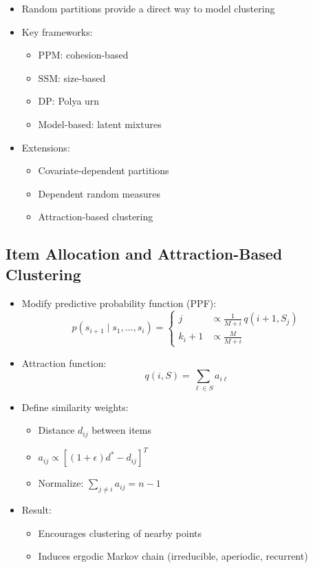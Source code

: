 \documentclass[12pt,oneside]{book}
\numberwithin{equation}{section}
\theoremstyle{definition}
\theoremstyle{plain}
\theoremstyle{remark}
\begin{document}
\begin{itemize}
\item Random partitions provide a direct way to model clustering

\item Key frameworks:
\begin{itemize}
\item PPM: cohesion-based
\item SSM: size-based
\item DP: Polya urn
\item Model-based: latent mixtures
\end{itemize}

\item Extensions:
\begin{itemize}
\item Covariate-dependent partitions
\item Dependent random measures
\item Attraction-based clustering
\end{itemize}
\end{itemize}

\subsection{Item Allocation and Attraction-Based Clustering}

\begin{itemize}
\item Modify predictive probability function (PPF):
\[
p(s_{i+1} \mid s_1,\dots,s_i)
=
\begin{cases}
j & \propto \frac{1}{M+i} \, q(i+1, S_j) \\
k_i+1 & \propto \frac{M}{M+i}
\end{cases}
\]

\item Attraction function:
\[
q(i, S) = \sum_{\ell \in S} a_{i\ell}
\]

\item Define similarity weights:
\begin{itemize}
\item Distance $d_{ij}$ between items
\item $a_{ij} \propto [(1+\epsilon)d^* - d_{ij}]^T$
\item Normalize: $\sum_{j \neq i} a_{ij} = n-1$
\end{itemize}

\item Result:
\begin{itemize}
\item Encourages clustering of nearby points
\item Induces ergodic Markov chain (irreducible, aperiodic, recurrent)
\end{itemize}
\end{itemize}
\end{document}
